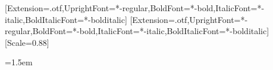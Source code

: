 \usepackage[a4paper,margin=25mm,headheight=15pt]{geometry}
\usepackage{fontspec}
\setmainfont{texgyretermes}[Extension=.otf,UprightFont=*-regular,BoldFont=*-bold,ItalicFont=*-italic,BoldItalicFont=*-bolditalic]
\setsansfont{texgyreheros}[Extension=.otf,UprightFont=*-regular,BoldFont=*-bold,ItalicFont=*-italic,BoldItalicFont=*-bolditalic]
\setmonofont{lmmono10-regular.otf}[Scale=0.88]
\usepackage{amsmath,amssymb,amsthm,mathtools}
\usepackage{booktabs,longtable,tabularx,array}
\usepackage{algorithm,algpseudocode}
\usepackage[section]{placeins}
\usepackage{enumitem}
\usepackage{xcolor}
\usepackage{microtype}
\usepackage{fancyhdr}
\usepackage{xurl}
\usepackage[colorlinks=true,linkcolor=black,citecolor=black,urlcolor=blue!45!black]{hyperref}
\usepackage{seqsplit}
\setlength{\parindent}{1.6em}
\setlength{\parskip}{0.2em}
\renewcommand{\arraystretch}{1.1}
\setlength{\LTcapwidth}{\textwidth}
\pagestyle{fancy}
\fancyhf{}
\fancyhead[R]{\small\sffamily\shorttitle}
\fancyfoot[C]{\thepage}
\renewcommand{\headrulewidth}{0.3pt}
\newcommand{\Z}{\mathbb Z}
\newcommand{\N}{\mathbb N}
\newcommand{\Span}{\operatorname{span}}
\newcommand{\lead}{\operatorname{lead}}
\newcommand{\val}{\operatorname{val}_p}
\newcommand{\ord}{\operatorname{ord}}
\newcommand{\core}{\operatorname{core}}
\newcommand{\Lean}[1]{\texttt{\expandafter\seqsplit\expandafter{\detokenize{#1}}}}
\newcommand{\artifacturl}{https://github.com/Zi-Gao/ASTRA4OI/tree/main/results/composite-modulus-basis}
\newcommand{\leanref}[1]{\par\smallskip{\footnotesize\sffamily Lean: \Lean{#1}.}\par}
\emergencystretch=1.5em
